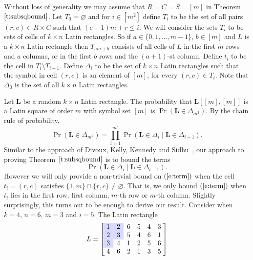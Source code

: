 \documentclass[12pt]{article}
\providecommand{\con}{\cellcolor{blue!15}}
\theoremstyle{definition}
\numberwithin{equation}{section}
\def\eref#1{$(\ref{#1})$}
\def\tref#1{Theorem~$\ref{#1}$}
\renewcommand{\leq}{\leqslant}
\renewcommand{\emptyset}{\varnothing}
\renewcommand{\L}{\mathbf{L}}
\begin{document}
	Without loss of generality we may assume that $R = C = S = [m]$ in \tref{t:subsqbound}. Let $T_0=\emptyset$ and for $i \in [m^2]$ define $T_i$ to be the set of all pairs $(r,c)\in R\times C$ such that $(c-1)m+r \leq i$.
	We will consider the sets $T_i$ to be sets of cells of $k \times n$ Latin rectangles. So if $a \in \{0, 1, \ldots, m-1\}$, $b \in [m]$ and $L$ is a $k \times n$ Latin rectangle then $T_{am+b}$ consists of all cells of $L$ in the first $m$ rows and $a$ columns, or in the first $b$ rows and the $(a+1)$-st column. Define $t_i$ to be the cell in $T_i \setminus T_{i-1}$. Define $\Delta_i$ to be the set of $k \times n$ Latin rectangles such that the symbol in cell $(r, c)$ is an element of $[m]$, for every $(r, c) \in T_i$. Note that $\Delta_0$ is the set of all $k \times n$ Latin rectangles. 
	
	Let $\L$ be a random $k \times n$ Latin rectangle. The probability that $\L[[m], [m]]$ is a Latin square of order $m$ with symbol set $[m]$ is $\Pr(\L \in \Delta_{m^2})$. By the chain rule of probability,
	\begin{equation}\label{e:cr}
		\Pr(\L \in \Delta_{m^2}) = \prod_{i=1}^{m^2} \Pr(\L \in \Delta_i \mid  \L \in \Delta_{i-1}).
	\end{equation}
	Similar to the approach of Divoux, Kelly, Kennedy and Sidhu~\cite{subsqrandom}, our approach to proving \tref{t:subsqbound} is to bound the terms 
	\begin{equation}\label{e:term}
		\Pr(\L \in \Delta_i \mid  \L \in \Delta_{i-1}).
	\end{equation}
	However we will only provide a non-trivial bound on \eref{e:term} when the cell $t_i = (r, c)$ satisfies $\{1, m\} \cap \{r, c\} \neq \emptyset$. That is, we only bound \eref{e:term} when $t_i$ lies in the first row, first column, $m$-th row or $m$-th column. Slightly surprisingly, this turns out to be enough to derive our result.  Consider when $k=4$, $n=6$, $m=3$ and $i=5$. The Latin rectangle
	\[
	L = \left[\;
	\begin{matrix}		
		\con1&\con2&6&5&4&3 \\
		\con2&\con3&5&4&6&1 \\
		\con3&4&1&2&5&6 \\
		4&6&2&1&3&5 \\
	\end{matrix}\;
	\right]
	\]
\end{document}
